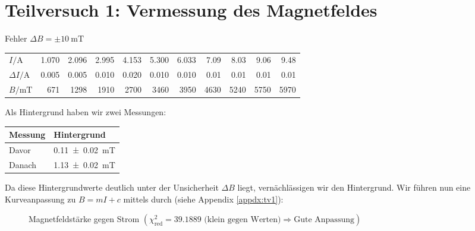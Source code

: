 \section{Teilversuch 1: Vermessung des Magnetfeldes}
	Fehler $\Delta B = \pm \SI{10}{\milli\tesla}$
	\begin{center}
		\begin{tabular}{l | *{10}{r}}
			\toprule
			$I/\si{\ampere}$ & \num{1.070} & \num{2.096} & \num{2.995} & \num{4.153} & \num{5.300} & \num{6.033} & \num{7.09} & \num{8.03} & \num{9.06} & \num{9.48} \\
			$\Delta I/\si{\ampere}$ & \num{0.005} & \num{0.005} & \num{0.010} & \num{0.020} & \num{0.010} & \num{0.010} & \num{0.01} & \num{0.01} & \num{0.01} & \num{0.01} \\
			\midrule
			$B/\si{\milli\tesla}$ & \num{671} & \num{1298} & \num{1910} & \num{2700} & \num{3460} & \num{3950} & \num{4630} & \num{5240} & \num{5750} & \num{5970} \\
			\bottomrule
		\end{tabular}
	\end{center}
	Als Hintergrund haben wir zwei Messungen:
	\begin{center}
		\begin{tabular}{ll}
			\toprule
			Messung & Hintergrund \\
			\midrule
			Davor  & \SI{0.11(2)}{\milli\tesla} \\
			Danach & \SI{1.13(2)}{\milli\tesla} \\
			\bottomrule
		\end{tabular}
	\end{center}
	Da diese Hintergrundwerte deutlich unter der Unsicherheit $\Delta B$ liegt, vernächlässigen wir den Hintergrund. 
	\newpage
	Wir führen nun eine Kurveanpassung zu $B = mI + c$ mittels \gnuplot{} durch (siehe Appendix \ref{appdx:tv1}):
	\begin{figure}[!ht]
		\vspace{-1em}
	    \centering
	    
	    \caption{\centering Magnetfeldstärke gegen Strom $\left(\chi^2_{\text{red}} = \num{39.1889} \text{ (klein gegen Werten)} \Rightarrow \text{Gute Anpassung}\right)$}
	    \label{fig:tv1}
	    \vspace{-1em}
	\end{figure}

